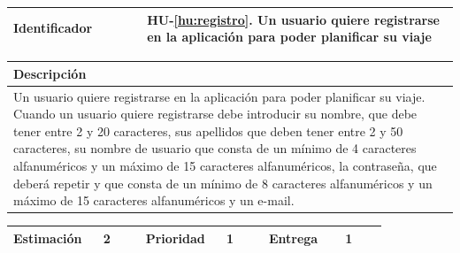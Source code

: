 \documentclass[11pt]{article}
\begin{document}
  \centering
  \begin{longtable}{p{0.3\linewidth}|p{0.7\linewidth}}
    \toprule
    \toprule
    \textbf{Identificador} & \textbf{HU-\ref{hu:registro}}. Un usuario quiere registrarse en la aplicación para poder planificar su viaje\\
    \bottomrule
  \end{longtable}

  \begin{longtable}{p{1.028\linewidth}}
    \textbf{Descripción}\\
    \midrule
    Un usuario quiere registrarse en la aplicación para poder planificar su viaje. Cuando un usuario quiere registrarse debe introducir su nombre, que debe tener entre 2 y 20 caracteres, sus apellidos que deben tener entre 2 y 50 caracteres, su nombre de usuario que consta de un mínimo de 4 caracteres alfanuméricos y un máximo de 15 caracteres alfanuméricos, la contraseña, que deberá repetir y que consta de un mínimo de 8 caracteres alfanuméricos y un máximo de 15 caracteres alfanuméricos y un e-mail.
  \end{longtable}

  \begin{longtable}{p{0.18\linewidth}|p{0.1\linewidth}|p{0.18\linewidth}|p{0.1\linewidth}|p{0.18\linewidth}|p{0.1\linewidth}}
    \toprule
    \textbf{Estimación} & 2 & \textbf{Prioridad} & 1 & \textbf{Entrega} & 1\\
    \bottomrule
  \end{longtable}
\end{document}
